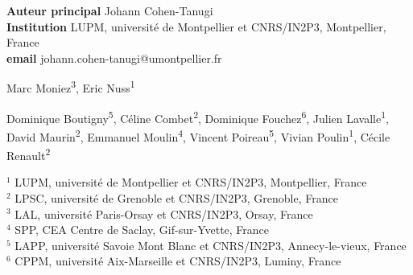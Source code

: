 
\def\altaffilmark#1{\textsuperscript{#1}}
\def\affil#1{\noindent #1 \\}

%

\begin{flushleft}
  {\bf Auteur principal}  Johann Cohen-Tanugi\\
  {\bf Institution}  LUPM, université de Montpellier et CNRS/IN2P3, Montpellier, France\\
  {\bf email} johann.cohen-tanugi@umontpellier.fr
\end{flushleft}       


\begin{raggedright}
\small
Marc Moniez\altaffilmark{3}, Eric Nuss\altaffilmark{1}
\end{raggedright}

\begin{raggedright}
\small
Dominique Boutigny\altaffilmark{5},
Céline Combet\altaffilmark{2},
Dominique Fouchez\altaffilmark{6},
Julien Lavalle\altaffilmark{1},
David Maurin\altaffilmark{2},
Emmanuel Moulin\altaffilmark{4},
Vincent Poireau\altaffilmark{5},
Vivian Poulin\altaffilmark{1},
Cécile Renault\altaffilmark{2}
\end{raggedright}

\scriptsize

\affil{$^{1}$ LUPM, université de Montpellier et CNRS/IN2P3, Montpellier, France}
\affil{$^{2}$ LPSC, université de Grenoble et CNRS/IN2P3, Grenoble, France}
\affil{$^{3}$ LAL, université Paris-Orsay et CNRS/IN2P3, Orsay, France}
\affil{$^{4}$ SPP, CEA Centre de Saclay, Gif-sur-Yvette, France}
\affil{$^{5}$ LAPP, université Savoie Mont Blanc et CNRS/IN2P3, Annecy-le-vieux, France}
\affil{$^{6}$ CPPM, université Aix-Marseille et CNRS/IN2P3, Luminy, France}
\normalsize
